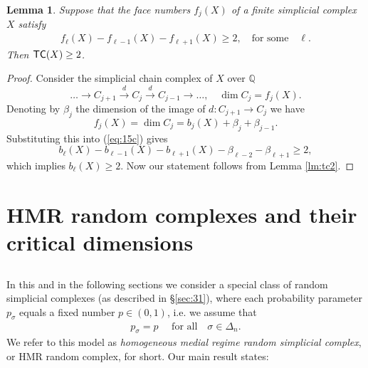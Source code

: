 \documentclass[11pt,twoside, reqno]{amsart}
\theoremstyle{plain}
\newtheorem{lema}{Lemma}
\newtheorem{corollary}[lema]{Corollary}
\theoremstyle{definition}
\newcommand{\TC}{\textrm{TC}}
\newcommand{\tc}{{\sf{TC}}}
\begin{document}
\begin{lema}\label{lm:tc22}
Suppose that the face numbers $f_j(X)$ of  a finite simplicial complex $X$ satisfy 
\begin{eqnarray}\label{eq:15c}
f_{\ell}(X)-f_{\ell-1}(X)-f_{\ell+1}(X)\ge 2,\quad \mbox{for some}\quad \ell.
\end{eqnarray}   
Then $\tc(X)\ge 2$. 
\end{lema}
\begin{proof} Consider the simplicial chain complex of $X$ over $\mathbb Q$
$$
\dots\to C_{j+1}\stackrel d\to C_j\stackrel d\to C_{j-1}\to \dots, \quad \dim C_j=f_j(X).
$$
Denoting by $\beta_j$ the dimension of the image of $d:C_{j+1}\to C_j$ we have 
$$
f_j(X) = \dim C_j=b_j(X)+\beta_j +\beta_{j-1}.
$$
Substituting this into  (\ref{eq:15c}) gives
$$
b_\ell(X) -b_{\ell-1}(X)-b_{\ell+1}(X)-\beta_{\ell-2}-\beta_{\ell+1}\ge 2,
$$
which implies  $b_\ell(X)\ge 2.$ Now our statement follows from Lemma \ref{lm:tc2}. 
\end{proof}


%
%

\section{HMR random complexes and their critical dimensions}\label{sec:hmr}
\subsection{} In this and in the following sections we consider a special class of random simplicial complexes (as described in \S\ref{sec:31}), where each probability parameter $p_\sigma$ equals a fixed number 
$p\in (0,1)$, i.e. 
we assume that 
\begin{eqnarray*}
p_\sigma=p\quad \mbox{ for all}\quad  \sigma\in \Delta_n.
\end{eqnarray*} 
We refer to this model as {\it homogeneous medial regime random simplicial complex}, or HMR random complex, for short.
Our main result states: 
\end{document}
